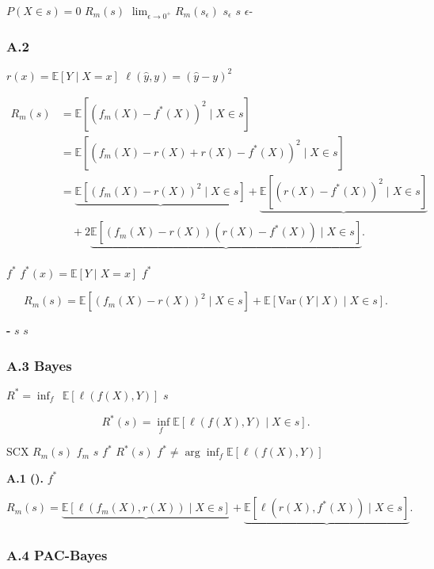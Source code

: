 \documentclass[
  12pt,
]{article}
\begin{document}
 \(P(X \in s) = 0\) \(R_m(s)\) 
\(\lim_{\epsilon \to 0^+} R_m(s_\epsilon)\) \(s_\epsilon\) 
\(s\)  \(\epsilon\)-

\subsubsection{A.2
}\label{a.2-ux4e0eux56deux5f52ux51fdux6570ux7684ux5173ux7cfb}

 \(r(x) = \mathbb{E}[Y \mid X = x]\)
\(\ell(\hat{y}, y) = (\hat{y} - y)^2\)

\[\begin{aligned}
R_m(s) &= \mathbb{E}[ (f_m(X) - f^*(X))^2 \mid X \in s ] \\
&= \mathbb{E}[ (f_m(X) - r(X) + r(X) - f^*(X))^2 \mid X \in s ] \\
&= \underbrace{\mathbb{E}[ (f_m(X) - r(X))^2 \mid X \in s ]}_{\text{}} + \underbrace{\mathbb{E}[ (r(X) - f^*(X))^2 \mid X \in s ]}_{\text{}} \\
&\quad + 2\underbrace{\mathbb{E}[ (f_m(X) - r(X))(r(X) - f^*(X)) \mid X \in s ]}_{\text{}}.
\end{aligned}\]

 \(f^*\)  \(f^*(x) = \mathbb{E}[Y \mid X = x]\)
 \(f^*\) 

\[R_m(s) = \mathbb{E}[ (f_m(X) - r(X))^2 \mid X \in s ] + \mathbb{E}[ \text{Var}(Y \mid X) \mid X \in s ].\]

\textbf{-} \(s\)
 \(s\) 

\subsubsection{A.3  Bayes
}\label{a.3-ux4e0e-bayes-ux98ceux9669ux7684ux5173ux7cfb}


\(R^* = \inf_{f \text{ }} \mathbb{E}[\ell(f(X), Y)]\)
\(s\)\textbf{}

\[R^*(s) = \inf_{f \text{ }} \mathbb{E}[\ell(f(X), Y) \mid X \in s].\]

 SCX  \(R_m(s)\)  \(f_m\)  \(s\)
\textbf{} \(f^*\)  \(R^*(s)\)
\(f^* \neq \arg\inf_f \mathbb{E}[\ell(f(X),Y)]\) 

\textbf{ A.1 ().}  \(f^*\)


\[R_m(s) = \underbrace{\mathbb{E}[\ell(f_m(X), r(X)) \mid X \in s]}_{\text{}} + \underbrace{\mathbb{E}[\ell(r(X), f^*(X)) \mid X \in s]}_{\text{}}.\]

\subsubsection{A.4  PAC-Bayes
}\label{a.4-ux4e0e-pac-bayes-ux7406ux8bbaux7684ux5173ux7cfb}
\end{document}
